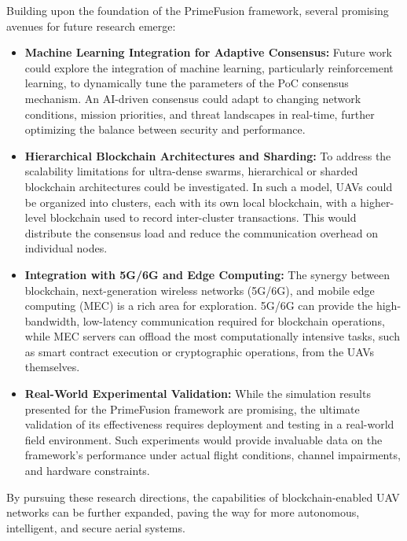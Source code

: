 Building upon the foundation of the PrimeFusion framework, several promising avenues for future research emerge:
\begin{itemize}
    \item \textbf{Machine Learning Integration for Adaptive Consensus:} Future work could explore the integration of machine learning, particularly reinforcement learning, to dynamically tune the parameters of the PoC consensus mechanism. An AI-driven consensus could adapt to changing network conditions, mission priorities, and threat landscapes in real-time, further optimizing the balance between security and performance.
    \item \textbf{Hierarchical Blockchain Architectures and Sharding:} To address the scalability limitations for ultra-dense swarms, hierarchical or sharded blockchain architectures could be investigated. In such a model, UAVs could be organized into clusters, each with its own local blockchain, with a higher-level blockchain used to record inter-cluster transactions. This would distribute the consensus load and reduce the communication overhead on individual nodes.
    \item \textbf{Integration with 5G/6G and Edge Computing:} The synergy between blockchain, next-generation wireless networks (5G/6G), and mobile edge computing (MEC) is a rich area for exploration. 5G/6G can provide the high-bandwidth, low-latency communication required for blockchain operations, while MEC servers can offload the most computationally intensive tasks, such as smart contract execution or cryptographic operations, from the UAVs themselves.
    \item \textbf{Real-World Experimental Validation:} While the simulation results presented for the PrimeFusion framework are promising, the ultimate validation of its effectiveness requires deployment and testing in a real-world field environment. Such experiments would provide invaluable data on the framework's performance under actual flight conditions, channel impairments, and hardware constraints.
\end{itemize}
By pursuing these research directions, the capabilities of blockchain-enabled UAV networks can be further expanded, paving the way for more autonomous, intelligent, and secure aerial systems.
